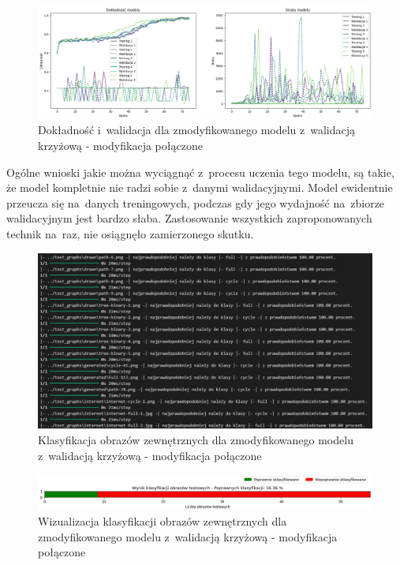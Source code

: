 \begin{figure}[ht]
	\centering
	\includegraphics[width=15.5cm]{resources/tests/images/v4/crossvalid_img.png}
	\caption{Dokładność i~walidacja dla zmodyfikowanego modelu z~walidacją krzyżową - modyfikacja połączone}
	\label{Fig:tests-cv-5a}
\end{figure}
\FloatBarrier

Ogólne wnioski jakie można wyciągnąć z~procesu uczenia tego modelu,
są takie, że model kompletnie nie radzi sobie z~danymi walidacyjnymi.
Model ewidentnie przeucza się na~danych treningowych,
podczas gdy jego wydajność na~zbiorze walidacyjnym jest bardzo słaba.
Zastosowanie wszystkich zaproponowanych technik na~raz,
nie osiągnęło zamierzonego skutku. 

\begin{figure}[ht]
	\centering
	\includegraphics[width=15.5cm]{resources/tests/images/v4/crossvalid_txt.png}
	\caption{Klasyfikacja obrazów zewnętrznych dla zmodyfikowanego modelu z~walidacją krzyżową - modyfikacja połączone}
	\label{Fig:tests-cv-5b}
\end{figure}
\FloatBarrier

\begin{figure}[ht]
	\centering
	\includegraphics[width=15.5cm]{resources/tests/images/v4/crossvalid_bar.png}
	\caption{Wizualizacja klasyfikacji obrazów zewnętrznych dla zmodyfikowanego modelu z~walidacją krzyżową - modyfikacja połączone}
	\label{Fig:tests-cv-5c}
\end{figure}
\FloatBarrier

